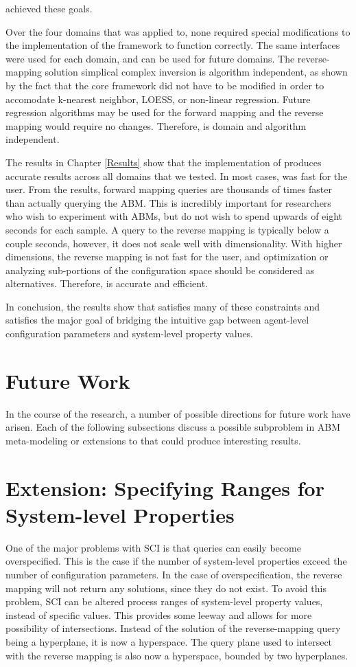 \fw achieved these goals.

Over the four domains that \fw was applied to, none required special modifications to the implementation of the framework to function correctly.
The same interfaces were used for each domain, and can be used for future domains.
The reverse-mapping solution simplical complex inversion is algorithm independent, as shown by the fact that the core framework did not have to be modified in order to accomodate k-nearest neighbor, LOESS, or non-linear regression.
Future regression algorithms may be used for the forward mapping and the reverse mapping would require no changes.
Therefore, \fw is domain and algorithm independent.

The results in Chapter \ref{Results} show that the implementation of \fw produces accurate results across all domains that we tested.
In most cases, \fw was fast for the user.
From the results, forward mapping queries are thousands of times faster than actually querying the ABM.
This is incredibly important for researchers who wish to experiment with ABMs, but do not wish to spend upwards of eight seconds for each sample.
A query to the reverse mapping is typically below a couple seconds, however, it does not scale well with dimensionality.
With higher dimensions, the reverse mapping is not fast for the user, and optimization or analyzing sub-portions of the configuration space should be considered as alternatives.
Therefore, \fw is accurate and efficient.

In conclusion, the results show that \fw satisfies many of these constraints and satisfies the major goal of bridging the intuitive gap between agent-level configuration parameters and system-level property values.

\section{Future Work}

In the course of the research, a number of possible directions for future work have arisen.
Each of the following subsections discuss a possible subproblem in ABM meta-modeling or extensions to \fw that could produce interesting results.

\section{Extension: Specifying Ranges for System-level Properties}
\label{sec:ranges}

One of the major problems with SCI is that queries can easily become overspecified.
This is the case if the number of system-level properties exceed the number of configuration parameters.
In the case of overspecification, the reverse mapping will not return any solutions, since they do not exist.
To avoid this problem, SCI can be altered process ranges of system-level property values, instead of specific values.
This provides some leeway and allows for more possibility of intersections.
Instead of the solution of the reverse-mapping query being a hyperplane, it is now a hyperspace.
The query plane used to intersect with the reverse mapping is also now a hyperspace, bounded by two hyperplanes.

